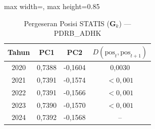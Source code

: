 \begin{table}[H]
\centering
\caption{Pergeseran Posisi STATIS ($\mathbf{G}_k$) --- PDRB_ADHK} \label{tab:app1jarak_statis_loading_pdrb_adhk}
\begin{adjustbox}{max width=\textwidth, max height=0.85\textheight}
\begin{tabular}{|c|c|c|c|}
\hline
\textbf{Tahun} & \textbf{PC1} & \textbf{PC2} & \textbf{$D(\text{pos}_t, \text{pos}_{t+1})$} \\
\hline
2020 & 0,7388 & -0,1604 & 0,0030 \\
2021 & 0,7391 & -0,1574 & $< 0,001$ \\
2022 & 0,7391 & -0,1566 & $< 0,001$ \\
2023 & 0,7390 & -0,1570 & $< 0,001$ \\
2024 & 0,7392 & -0,1568 & -- \\
\hline
\end{tabular}
\end{adjustbox}
\end{table}